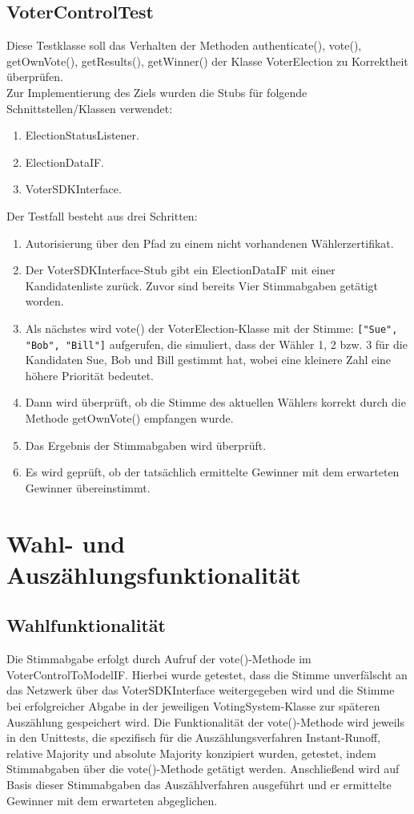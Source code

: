 \documentclass[parskip=full]{scrartcl}
\begin{document}
\subsection{VoterControlTest}
Diese Testklasse soll das Verhalten der Methoden authenticate(), vote(), getOwnVote(), getResults(), getWinner() der Klasse VoterElection zu Korrektheit überprüfen.\\
Zur Implementierung des Ziels wurden die Stubs für folgende Schnittstellen/Klassen verwendet:

\begin{enumerate}
	\item ElectionStatusListener.
	\item ElectionDataIF.
	\item VoterSDKInterface.
\end{enumerate}

Der Testfall besteht aus drei Schritten:

\begin{enumerate}
	\item Autorisierung über den Pfad zu einem nicht vorhandenen Wählerzertifikat.
	\item Der VoterSDKInterface-Stub gibt ein ElectionDataIF mit einer Kandidatenliste zurück. Zuvor sind bereits
	Vier Stimmabgaben getätigt worden.
	\item Als nächstes wird  vote()  der VoterElection-Klasse mit der Stimme: \verb|["Sue", "Bob", "Bill"]| aufgerufen, die simuliert, dass der Wähler 1, 2 bzw. 3 für die Kandidaten Sue, Bob und Bill gestimmt hat, wobei eine kleinere Zahl eine höhere Priorität bedeutet.
	
	\item Dann wird überprüft, ob die Stimme des aktuellen Wählers korrekt durch die Methode getOwnVote() empfangen
	wurde.
	\item Das Ergebnis der Stimmabgaben wird überprüft.
	\item Es wird geprüft, ob der tatsächlich ermittelte Gewinner mit dem erwarteten Gewinner übereinstimmt.
\end{enumerate}

\section{Wahl- und Auszählungsfunktionalität}
\subsection{Wahlfunktionalität}
Die Stimmabgabe erfolgt durch Aufruf der vote()-Methode im VoterControlToModelIF.
Hierbei wurde getestet, dass die Stimme unverfälscht an das Netzwerk über das VoterSDKInterface weitergegeben wird und die Stimme bei erfolgreicher Abgabe in der jeweiligen VotingSystem-Klasse zur späteren Auszählung gespeichert wird.
Die Funktionalität der vote()-Methode wird jeweils in den Unittests, die spezifisch für die Auszählungsverfahren Instant-Runoff, relative Majority und absolute Majority konzipiert wurden, getestet, indem Stimmabgaben über die vote()-Methode getätigt werden. Anschließend wird auf Basis dieser Stimmabgaben das Auszählverfahren ausgeführt und er ermittelte Gewinner mit dem erwarteten abgeglichen.\\
\end{document}
